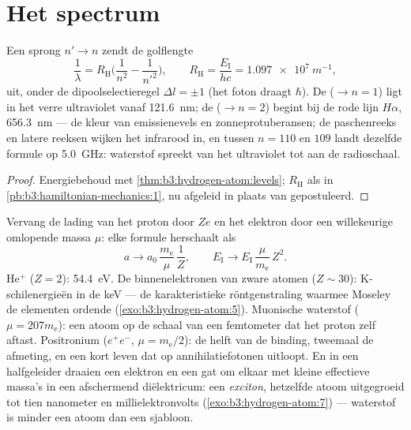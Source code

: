 \section{Het spectrum}

\begin{proposition}\label{prop:b3:hydrogen-atom:series}
Een sprong $n' \to n$ zendt de golflengte
\[
\frac{1}{\lambda} = R_{\text{H}}\Big(\frac{1}{n^2} -
\frac{1}{n'^2}\Big) , \qquad
R_{\text{H}} = \frac{E_{\text{I}}}{hc} = \qty{1.097e7}{m^{-1}} ,
\]
uit, onder de dipoolselectieregel $\Delta l = \pm1$ (het foton draagt
$\hbar$). De  ($\to n = 1$) ligt in het verre ultraviolet vanaf
\qty{121.6}{nm}; de  ($\to n = 2$) begint bij de rode lijn
$H\alpha$, \qty{656.3}{nm} --- de kleur van emissienevels en
zonneprotuberansen; de paschenreeks en latere reeksen wijken het
infrarood in, en tussen $n = 110$ en $109$ landt dezelfde formule op
\qty{5.0}{GHz}: waterstof spreekt van het ultraviolet tot aan de
radioschaal.
\end{proposition}

\begin{proof}
Energiebehoud met \cref{thm:b3:hydrogen-atom:levels};
$R_{\text{H}}$ als in \cref{pb:b3:hamiltonian-mechanics:1}, nu afgeleid in
plaats van gepostuleerd.
\end{proof}

\begin{example}\label{ex:b3:hydrogen-atom:scaling}
Vervang de lading van het proton door $Ze$ en het elektron door een
willekeurige omlopende massa $\mu$: elke formule herschaalt als
\[
a \to a_0\,\frac{m_{\text{e}}}{\mu}\,\frac1Z , \qquad
E_{\text{I}} \to E_{\text{I}}\,\frac{\mu}{m_{\text{e}}}\,Z^2 .
\]
He$^+$ ($Z = 2$): \qty{54.4}{eV}. De binnenelektronen van zware atomen
($Z \sim 30$): K-schilenergieën in de keV --- de karakteristieke
röntgenstraling waarmee Moseley de elementen ordende
(\cref{exo:b3:hydrogen-atom:5}). Muonische waterstof ($\mu = 207
m_{\text{e}}$): een atoom op de schaal van een femtometer dat het proton
zelf aftast. Positronium ($e^+e^-$, $\mu = m_{\text{e}}/2$): de helft van
de binding, tweemaal de afmeting, en een kort leven dat op
annihilatiefotonen uitloopt. En in een halfgeleider draaien een elektron
en een gat om elkaar met kleine effectieve massa's in een afschermend
diëlektricum: een \emph{exciton}, hetzelfde atoom uitgegroeid tot tien
nanometer en millielektronvolts (\cref{exo:b3:hydrogen-atom:7}) ---
waterstof is minder een atoom dan een sjabloon.
\end{example}

